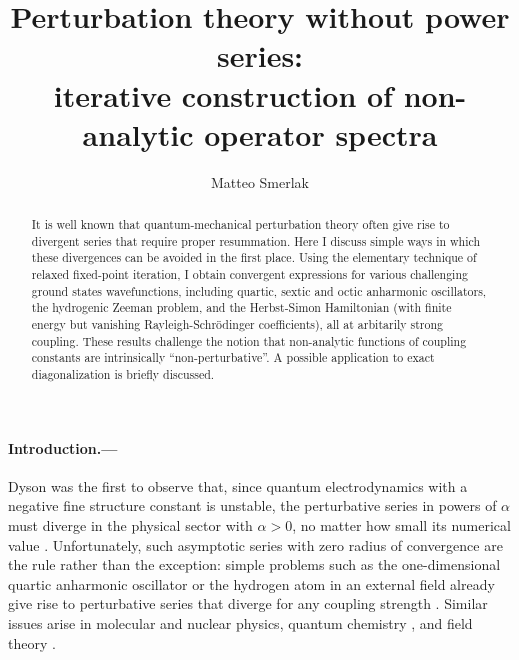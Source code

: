 \documentclass[aps,prl,reprint]{revtex4-2}
\begin{document}
	\title{Perturbation theory without power series:\\ iterative construction of non-analytic operator spectra}

	\author{Matteo Smerlak}


	\begin{abstract}
	It is well known that quantum-mechanical perturbation theory often give rise to divergent series that require proper resummation. Here I discuss simple ways in which these divergences can be avoided in the first place. Using the elementary technique of relaxed fixed-point iteration, I obtain convergent expressions for various challenging ground states wavefunctions, including quartic, sextic and octic anharmonic oscillators, the hydrogenic Zeeman problem, and the Herbst-Simon Hamiltonian (with finite energy but vanishing Rayleigh-Schr\"odinger coefficients), all at arbitarily strong coupling. These results challenge the notion that non-analytic functions of coupling constants are intrinsically ``non-perturbative''. A possible application to exact diagonalization is briefly discussed.
	\end{abstract}%

	\maketitle


	\paragraph{Introduction.---} Dyson was the first to observe that, since quantum electrodynamics with a negative fine structure constant is unstable, the perturbative series in powers of $\alpha$ must diverge in the physical sector with $\alpha > 0$, no matter how small its numerical value \cite{dysonDivergencePerturbationTheory1952}. Unfortunately, such asymptotic series with zero radius of convergence are the rule rather than the exception: simple problems such as the one-dimensional quartic anharmonic oscillator or the hydrogen atom in an external field already give rise to perturbative series that diverge for any coupling strength \cite{simon1982large}. Similar issues arise in molecular \cite{cizekLargeOrderPerturbation1982} and nuclear \cite{rothPaderesummedHighorderPerturbation2010} physics, quantum chemistry \cite{christiansen1996inherent}, and field theory \cite{rivasseauPerturbativeConstructiveRenormalization1991}. %
\end{document}
